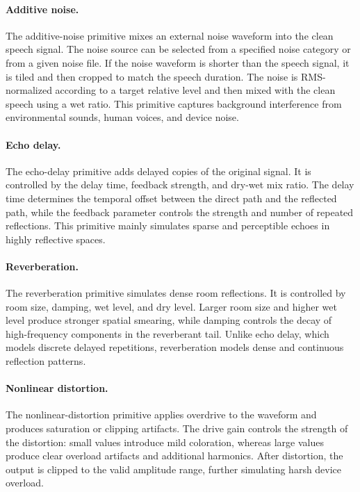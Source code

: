 \documentclass{llmxive}
\begin{document}
\paragraph{Additive noise.}
The additive-noise primitive mixes an external noise waveform into the clean
speech signal. The noise source can be selected from a specified noise category
or from a given noise file. If the noise waveform is shorter than the speech
signal, it is tiled and then cropped to match the speech duration. The noise is
RMS-normalized according to a target relative level and then mixed with the
clean speech using a wet ratio. This primitive captures background interference
from environmental sounds, human voices, and device noise.

\paragraph{Echo delay.}
The echo-delay primitive adds delayed copies of the original signal. It is
controlled by the delay time, feedback strength, and dry-wet mix ratio. The
delay time determines the temporal offset between the direct path and the
reflected path, while the feedback parameter controls the strength and number
of repeated reflections. This primitive mainly simulates sparse and perceptible
echoes in highly reflective spaces.

\paragraph{Reverberation.}
The reverberation primitive simulates dense room reflections. It is controlled
by room size, damping, wet level, and dry level. Larger room size and higher wet
level produce stronger spatial smearing, while damping controls the decay of
high-frequency components in the reverberant tail. Unlike echo delay, which
models discrete delayed repetitions, reverberation models dense and continuous
reflection patterns.

\paragraph{Nonlinear distortion.}
The nonlinear-distortion primitive applies overdrive to the waveform and
produces saturation or clipping artifacts. The drive gain controls the strength
of the distortion: small values introduce mild coloration, whereas large values
produce clear overload artifacts and additional harmonics. After distortion, the
output is clipped to the valid amplitude range, further simulating harsh device
overload.
\end{document}
